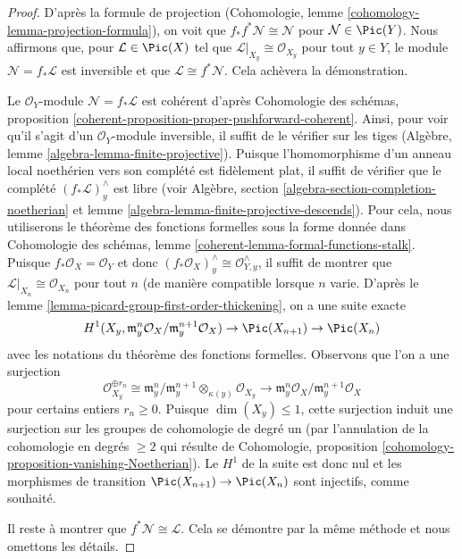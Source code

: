 \begin{proof}
D'après la formule de projection
(Cohomologie, lemme \ref{cohomology-lemma-projection-formula}),
on voit que $f_*f^*\mathcal{N} \cong \mathcal{N}$ pour
$\mathcal{N} \in \Pic(Y)$.
Nous affirmons que, pour $\mathcal{L} \in \Pic(X)$ tel que
$\mathcal{L}|_{X_y} \cong \mathcal{O}_{X_y}$
pour tout $y \in Y$, le module $\mathcal{N} = f_*\mathcal{L}$
est inversible et que $\mathcal{L} \cong f^*\mathcal{N}$.
Cela achèvera la démonstration.

\medskip\noindent
Le $\mathcal{O}_Y$-module $\mathcal{N} = f_*\mathcal{L}$
est cohérent d'après Cohomologie des schémas, proposition
\ref{coherent-proposition-proper-pushforward-coherent}.
Ainsi, pour voir qu'il s'agit d'un $\mathcal{O}_Y$-module inversible,
il suffit de le vérifier sur les tiges (Algèbre, lemme
\ref{algebra-lemma-finite-projective}).
Puisque l'homomorphisme d'un anneau local noethérien vers son complété
est fidèlement plat, il suffit de vérifier que le complété
$(f_*\mathcal{L})_y^\wedge$ est libre (voir
Algèbre, section \ref{algebra-section-completion-noetherian} et
lemme \ref{algebra-lemma-finite-projective-descends}).
Pour cela, nous utiliserons le théorème des fonctions formelles sous la forme donnée dans
Cohomologie des schémas, lemme \ref{coherent-lemma-formal-functions-stalk}.
Puisque $f_*\mathcal{O}_X = \mathcal{O}_Y$ et donc
$(f_*\mathcal{O}_X)_y^\wedge \cong \mathcal{O}_{Y, y}^\wedge$,
il suffit de montrer que $\mathcal{L}|_{X_n} \cong \mathcal{O}_{X_n}$
pour tout $n$ (de manière compatible lorsque $n$ varie.
D'après le lemme \ref{lemma-picard-group-first-order-thickening},
on a une suite exacte
$$
H^1(X_y, \mathfrak m_y^n\mathcal{O}_X/\mathfrak m_y^{n + 1}\mathcal{O}_X)
\to \Pic(X_{n + 1}) \to \Pic(X_n)
$$
avec les notations du théorème des fonctions formelles.
Observons que l'on a une surjection
$$
\mathcal{O}_{X_y}^{\oplus r_n} \cong
\mathfrak m_y^n/\mathfrak m_y^{n + 1} \otimes_{\kappa(y)} \mathcal{O}_{X_y}
\longrightarrow
\mathfrak m_y^n\mathcal{O}_X/\mathfrak m_y^{n + 1}\mathcal{O}_X
$$
pour certains entiers $r_n \geq 0$.
Puisque $\dim(X_y) \leq 1$, cette surjection induit une surjection
sur les groupes de cohomologie de degré un (par l'annulation de la cohomologie en degrés $\geq 2$
qui résulte de Cohomologie, proposition
\ref{cohomology-proposition-vanishing-Noetherian}).
Le $H^1$ de la suite est donc nul et les morphismes de transition
$\Pic(X_{n + 1}) \to \Pic(X_n)$ sont injectifs, comme souhaité.

\medskip\noindent
Il reste à montrer que $f^*\mathcal{N} \cong \mathcal{L}$.
Cela se démontre par la même méthode et nous omettons les détails.
\end{proof}









